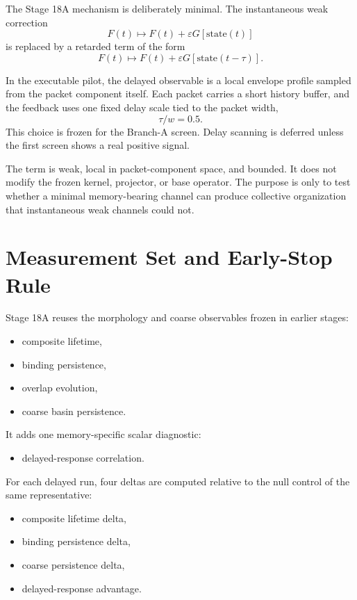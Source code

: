 \documentclass[11pt]{article}
\begin{document}
The Stage 18A mechanism is deliberately minimal. The instantaneous weak correction
\[
F(t) \mapsto F(t) + \varepsilon G[\mathrm{state}(t)]
\]
is replaced by a retarded term of the form
\[
F(t) \mapsto F(t) + \varepsilon G[\mathrm{state}(t-\tau)].
\]

In the executable pilot, the delayed observable is a local envelope profile sampled from the packet component itself. Each packet carries a short history buffer, and the feedback uses one fixed delay scale tied to the packet width,
\[
\tau / w = 0.5.
\]
This choice is frozen for the Branch-A screen. Delay scanning is deferred unless the first screen shows a real positive signal.

The term is weak, local in packet-component space, and bounded. It does not modify the frozen kernel, projector, or base operator. The purpose is only to test whether a minimal memory-bearing channel can produce collective organization that instantaneous weak channels could not.

\section{Measurement Set and Early-Stop Rule}

Stage 18A reuses the morphology and coarse observables frozen in earlier stages:
\begin{itemize}
\item composite lifetime,
\item binding persistence,
\item overlap evolution,
\item coarse basin persistence.
\end{itemize}

It adds one memory-specific scalar diagnostic:
\begin{itemize}
\item delayed-response correlation.
\end{itemize}

For each delayed run, four deltas are computed relative to the null control of the same representative:
\begin{itemize}
\item composite lifetime delta,
\item binding persistence delta,
\item coarse persistence delta,
\item delayed-response advantage.
\end{itemize}
\end{document}
